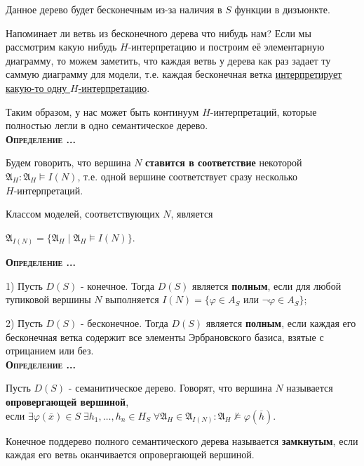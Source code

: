 \documentclass[18pt, a4paper]{extarticle}
\newcounter{par}
\newcounter{spar}
\newcounter{zap}
\newcommand{\opr}{\textbf{\textsc{Определение \thepar.\if\thespar1\thespar.\fi\thezap.\;}}\stepcounter{zap}}
\newcommand{\mA}{\mathfrak{A}}
\newcommand{\ovl}[1]{\overline{#1}}
\newcommand{\vp}{\varphi}
\newcommand{\vD}{\vDash}
\newcommand{\lot}[3]{#1_#2,\dots,#1_#3}
\begin{document}
\begin{center}
\begin{tikzpicture}
\end{tikzpicture}
\end{center}

Данное дерево будет бесконечным из-за наличия в $S$ функции в дизъюнкте. 

Напоминает ли ветвь из бесконечного дерева что нибудь нам? Если мы рассмотрим какую нибудь $H$-интерпретацию и построим её элементарную диаграмму, то можем заметить, что каждая ветвь у дерева как раз задает ту саммую диаграмму для модели, т.е. каждая бесконечная ветка \underline{интерпретирует} \underline{какую-то одну $H$-интерпретацию}. 

Таким образом, у нас может быть континуум $H$-интерпретаций, которые полностью легли в одно семантическое дерево.\\

\opr 

Будем говорить, что вершина $N$ \textbf{ставится в соответствие} некоторой
\\$\mA_H\!:\mA_H\!\vD\! I(N)$, т.е. одной вершине соответствует сразу несколько\\$H$-интерпретаций.

Классом моделей, соответствующих $N$, является 

\begin{center}
    $\mA_{I(N)}=\{\mA_H\;|\;\mA_H\vD I(N)\}$.\\
\end{center}

\newpage

\opr 

1) Пусть $D(S)$ - конечное. Тогда $D(S)$ является \textbf{полным}, если для любой тупиковой вершины $N$ выполняется $I(N)=\{\vp\in A_S\text{ или }\lnot\vp\in A_S\}$;

2) Пусть $D(S)$ - бесконечное. Тогда $D(S)$ является \textbf{полным}, если каждая его бесконечная ветка содержит все элементы Эрбрановского базиса, взятые с отрицанием или без.\\

\opr 

Пусть $D(S)$ - семанитическое дерево. Говорят, что вершина $N$ называется \textbf{опровергающей вершиной}, \\
если $\exists\vp(\ovl x)\in S\;\exists\lot h 1 n\in H_S\;\forall\mA_H\in\mA_{I(N)}\!:\mA_H\nvDash\vp(\ovl h)$.

Конечное поддерево полного семантического дерева называется \textbf{замкнутым}, если каждая его ветвь оканчивается опровергающей вершиной.\\
\end{document}
